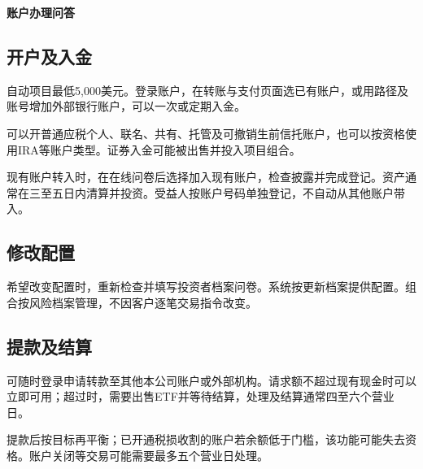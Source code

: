 \documentclass[UTF8,fontset=none,11pt,a4paper]{ctexart}
\begin{document}
{\noindent\fontsize{20}{25}\selectfont\bfseries 账户办理问答\par}
\vspace{10pt}
\subsection*{开户及入金}
自动项目最低5,000美元。登录账户，在转账与支付页面选已有账户，或用路径及账号增加外部银行账户，可以一次或定期入金。


可以开普通应税个人、联名、共有、托管及可撤销生前信托账户，也可以按资格使用IRA等账户类型。证券入金可能被出售并投入项目组合。


现有账户转入时，在在线问卷后选择加入现有账户，检查披露并完成登记。资产通常在三至五日内清算并投资。受益人按账户号码单独登记，不自动从其他账户带入。


\subsection*{修改配置}
希望改变配置时，重新检查并填写投资者档案问卷。系统按更新档案提供配置。组合按风险档案管理，不因客户逐笔交易指令改变。


\subsection*{提款及结算}
可随时登录申请转款至其他本公司账户或外部机构。请求额不超过现有现金时可以立即可用；超过时，需要出售ETF并等待结算，处理及结算通常四至六个营业日。


提款后按目标再平衡；已开通税损收割的账户若余额低于门槛，该功能可能失去资格。账户关闭等交易可能需要最多五个营业日处理。
\end{document}
